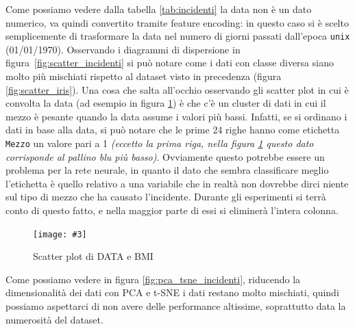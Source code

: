 \documentclass[12pt, twoside, letterpaper]{report}
\newcommand{\img}[4] {
	\begin{figure}
		\centering
		\texttt{[image: \#3]}\\
		\caption{#1}
		\label{fig:#4}
	\end{figure}
}
\begin{document}
			Come possiamo vedere dalla tabella \ref{tab:incidenti} la data non è un dato numerico, va quindi convertito tramite feature encoding: in questo caso si è scelto semplicemente di trasformare la data nel numero di giorni passati dall'epoca \texttt{unix} (01/01/1970). Osservando i diagrammi di dispersione in figura~\ref{fig:scatter_incidenti} si può notare come i dati con classe diversa siano molto più mischiati rispetto al dataset visto in precedenza (figura \ref{fig:scatter_iris}). Una cosa che salta all'occhio osservando gli scatter plot in cui è convolta la data (ad esempio in figura \ref{fig:scatter_data}) è che c'è un cluster di dati in cui il mezzo è pesante quando la data assume i valori più bassi. Infatti, se si ordinano i dati in base alla data, si può notare che le prime 24 righe hanno come etichetta \texttt{Mezzo} un valore pari a 1 \textit{(eccetto la prima riga, nella figura \ref{fig:scatter_data} questo dato corrisponde al pallino blu più basso)}. Ovviamente questo potrebbe essere un problema per la rete neurale, in quanto il dato che sembra classificare meglio l'etichetta è quello relativo a una variabile che in realtà non dovrebbe dirci niente sul tipo di mezzo che ha causato l'incidente. Durante gli esperimenti si terrà conto di questo fatto, e nella maggior parte di essi si eliminerà l'intera colonna. 
			
			\img{Scatter plot di DATA e BMI}{0.4}{scatter_data.png}{scatter_data}
			
			Come possiamo vedere in figura \ref{fig:pca_tsne_incidenti}, riducendo la dimensionalità dei dati con PCA e t-SNE i dati restano molto mischiati, quindi possiamo aspettarci di non avere delle performance altissime, soprattutto data la numerosità del dataset.
			
\end{document}
